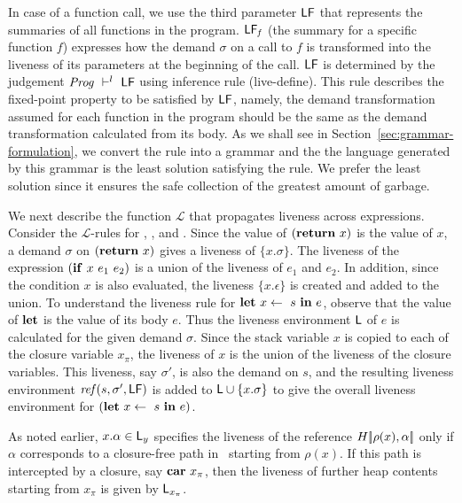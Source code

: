 \documentclass[preprint,9pt]{sigplanconf}
\newcommand{\oxlb}{\ensuremath{[\!|}}
\newcommand{\oxrb}{\ensuremath{|\!]}}
\begin{document}
In case of a  function call, we  use the third  parameter $\mathsf{LF}$
that  represents  the  summaries  of all  functions  in  the  program.
$\mathsf{LF}_{\mathit  f}$  (the summary for a  specific
function $f$) expresses  how the demand $\sigma$ on a  call to $f$ is
transformed into  the liveness of  its parameters at the  beginning of
the  call.  $\mathsf{LF}$  is determined  by the  judgement $\mathit{Prog}
\ \vdash^l\   \mathsf{LF}$ using  inference rule  ({\sc live-define}).   This rule
describes  the  fixed-point property  to  be  satisfied by  $\mathsf{LF}$,
namely, the  demand transformation  assumed for  each function  in the
program should  be the  same as  the demand  transformation calculated
from      its      body.       As       we      shall      see      in
Section~\ref{sec:grammar-formulation},  we  convert  the rule  into  a
grammar and  the the language generated  by this grammar is  the least
solution satisfying  the rule. We  prefer the least solution  since it
ensures the safe collection of the greatest amount of garbage.

We next  describe the function $\mathcal{L}$  that propagates liveness
across  expressions.   Consider  the $\mathcal{L}$-rules  for  {\LET},
{\SIF}, and {\SRETURN}.  Since the value of $(\mbox{$\mathbf{ return}$}~x)$ is the
value  of  $x$,  a  demand $\sigma$  on  $(\mbox{$\mathbf{ return}$}~x)$  gives  a
liveness   of  $\{x.\sigma\}$.    The  liveness   of  the   expression
$(\mbox{$\mathbf{ if}$}~x~e_1~e_2)$  is  a union  of  the  liveness of  $e_1$  and
$e_2$. In  addition, since  the condition $x$  is also  evaluated, the
liveness $\{x.\epsilon\}$ is created and  added to the union.  
To  understand  the  liveness rule  for  $\mbox{$\mathbf{ let}$}~x  \leftarrow~s~\mbox{$\mathbf{ in}$}~e$,
observe that the value  of $\mbox{$\mathbf{ let}$}$ is the value of  its body $e$.  Thus
the  liveness environment  $\mathsf{L}$ of  $e$ is  calculated for  the given
demand $\sigma$. Since the stack variable $x$ is copied to each of the
closure variable  $x_{\pi}$, the liveness of  $x$ is the union  of the
liveness of the  closure variables.  This liveness,  say $\sigma'$, is
also  the  demand  on  $s$, and  the  resulting  liveness  environment
$\mathit{ref}(s,   \sigma',   \mathsf{LF})$   is  added   to   $\mathsf{L}   \cup
\{x.\sigma\}$ to  give the  overall liveness environment  for $(\mbox{$\mathbf{ let}$}~x
\leftarrow~s~\mbox{$\mathbf{ in}$}~e)$.

As noted earlier, $x.\alpha \in  \mathsf{L}_y$ specifies the liveness  of the
reference $\heap\oxlb\rho(x), \alpha\oxrb$  only if $\alpha$ corresponds to  a closure-free path
in \heap\   starting from $\rho(x)$.  If this  path is intercepted  by a
closure,  say  $\mbox{$\mathbf{car}$}~{x_{\pi}}$, then  the  liveness  of further  heap
contents starting from $x_{\pi}$ is given by $\mathsf{L}_{x_{\pi}}$.
\end{document}
